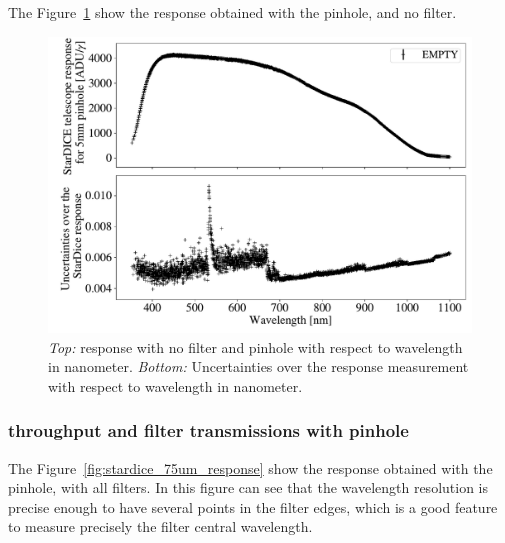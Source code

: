 The Figure~\ref{fig:stardice_5mm_response} show the \SD response obtained with the \bpinhole pinhole, and no filter.

\begin{figure}[h]
    \centering
    \includegraphics[width=\columnwidth]{fig/stardice_5mm_response.pdf}
    \caption{\textit{Top:} \SD response with no filter and \bpinhole pinhole with respect to wavelength in nanometer. \textit{Bottom:} Uncertainties over the \SD response measurement with respect to wavelength in nanometer.}
    \label{fig:stardice_5mm_response}
\end{figure}

\subsubsection{\SD throughput and filter transmissions with \spinhole pinhole}

The Figure~\ref{fig:stardice_75um_response} show the \SD response obtained with the \spinhole pinhole, with all filters. In this figure can see that the wavelength resolution is precise enough to have several points in the filter edges, which is a good feature to measure precisely the filter central wavelength. 

